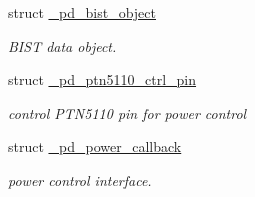 \begin{DoxyCompactItemize}
struct \hyperlink{struct__pd__bist__object}{\-\_\-pd\-\_\-bist\-\_\-object}
\begin{DoxyCompactList}\small\item\em B\-I\-S\-T data object. \end{DoxyCompactList}\item 
struct \hyperlink{struct__pd__ptn5110__ctrl__pin}{\-\_\-pd\-\_\-ptn5110\-\_\-ctrl\-\_\-pin}
\begin{DoxyCompactList}\small\item\em control P\-T\-N5110 pin for power control \end{DoxyCompactList}\item 
struct \hyperlink{struct__pd__power__callback}{\-\_\-pd\-\_\-power\-\_\-callback}
\begin{DoxyCompactList}\small\item\em power control interface. \end{DoxyCompactList}\end{DoxyCompactItemize}
